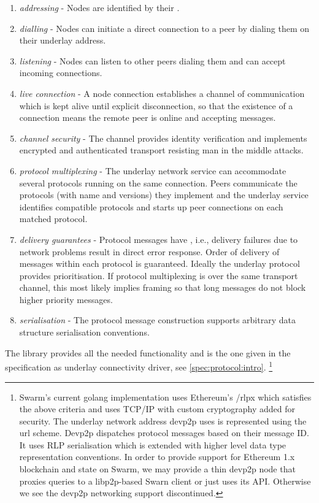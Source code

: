 \begin{enumerate}
    \item \emph{addressing} - Nodes are identified by their .
    \item \emph{dialling} - Nodes can initiate a direct connection to a peer by dialing them on their underlay address.
    \item \emph{listening} - Nodes can listen to other peers dialing them and can accept incoming connections.
    \item \emph{live connection} - A node connection establishes a channel of communication which is kept alive until explicit disconnection, so that the existence of a connection means the remote peer is online and accepting messages.
    \item \emph{channel security} - 
    The channel provides identity verification and implements encrypted and authenticated transport resisting man in the middle attacks.
    \item \emph{protocol multiplexing} - 
    The underlay network service can accommodate several protocols running on the same connection. Peers communicate the protocols (with name and versions) they implement and the underlay service identifies compatible protocols and starts up peer connections on each matched protocol. 
    \item \emph{delivery guarantees} - 
    Protocol messages have , i.e., delivery failures due to network problems result in direct error response. 
    Order of delivery of messages within each protocol is guaranteed. 
    Ideally the underlay protocol provides prioritisation. 
    If protocol multiplexing is over the same transport channel, this most likely implies framing so that long messages do not block higher priority messages.
    \item \emph{serialisation} - 
    The protocol message construction supports arbitrary data structure serialisation conventions.
    
\end{enumerate}

The  library provides all the needed functionality and is the one given in the specification as underlay connectivity driver, see \ref{spec:protocol:intro}.%
%
\footnote{Swarm's current golang implementation uses Ethereum's /rlpx which satisfies the above criteria and uses TCP/IP with custom cryptography added for security. The underlay network address devp2p uses is represented using the  url scheme. Devp2p dispatches protocol messages based on their message ID. It uses RLP serialisation which is extended with higher level data type representation conventions. In order to provide support for Ethereum 1.x blockchain and state on Swarm, we may provide a thin devp2p node that proxies queries to a libp2p-based Swarn client or just uses its API. Otherwise we see the devp2p networking support discontinued.}

